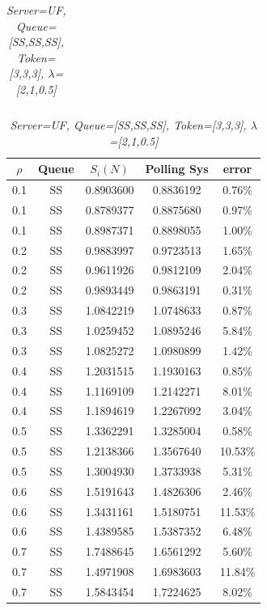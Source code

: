 \documentclass[12pt,a4paper,italian]{article}
\begin{document}
\begin{table}[ht!]
\begin{minipage}[b]{0.48\linewidth}
\begin{tabular}{c c c c c}
			
		\end{tabular}
	\end{minipage}
	\hspace{0.5cm}
	\begin{minipage}[b]{0.48\linewidth}
		\centering
		\caption{\scriptsize \emph{Server=UF, Queue=[SS,SS,SS], Token=[3,3,3], $\lambda$=[2,1,0.5]}}
		\label{tab20}
		\tiny
		\begin{tabular}{c c c c c}
			\hline
			$\rho$ & Queue & $S_i(N)$ & Polling Sys & error \\ \hline
			 0.1 & SS & 0.8903600 &   0.8836192    & 0.76\%  \\
			 0.1 & SS & 0.8789377 &   0.8875680    & 0.97\%  \\
			 0.1 & SS & 0.8987371 &   0.8898055    & 1.00\%  \\ \hline \hline
			 0.2 & SS & 0.9883997 &   0.9723513    & 1.65\%  \\
			 0.2 & SS & 0.9611926 &   0.9812109    & 2.04\%  \\
			 0.2 & SS & 0.9893449 &   0.9863191    & 0.31\%  \\ \hline \hline
			 0.3 & SS & 1.0842219 &   1.0748633    & 0.87\%  \\
			 0.3 & SS & 1.0259452 &   1.0895246    & 5.84\%  \\
			 0.3 & SS & 1.0825272 &   1.0980899    & 1.42\%  \\ \hline \hline
			 0.4 & SS & 1.2031515 &   1.1930163    & 0.85\%  \\
			 0.4 & SS & 1.1169109 &   1.2142271    & 8.01\%  \\
			 0.4 & SS & 1.1894619 &   1.2267092    & 3.04\%  \\ \hline \hline
			 0.5 & SS & 1.3362291 &   1.3285004    & 0.58\%  \\
			 0.5 & SS & 1.2138366 &   1.3567640    & 10.53\% \\
			 0.5 & SS & 1.3004930 &   1.3733938    & 5.31\%  \\ \hline \hline
			 0.6 & SS & 1.5191643 &   1.4826306    & 2.46\%  \\
			 0.6 & SS & 1.3431161 &   1.5180751    & 11.53\% \\
			 0.6 & SS & 1.4389585 &   1.5387352    & 6.48\%  \\ \hline \hline
			 0.7 & SS & 1.7488645 &   1.6561292    & 5.60\%  \\
			 0.7 & SS & 1.4971908 &   1.6983603    & 11.84\% \\
			 0.7 & SS & 1.5843454 &   1.7224625    & 8.02\%  \\ \hline \hline

\end{tabular}
\end{minipage}
\end{table}
\end{document}
